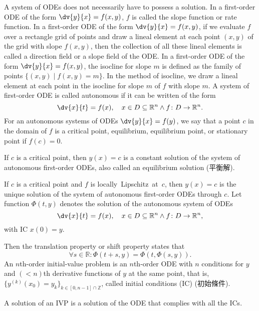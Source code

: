 \documentclass[a4paper,12pt]{report}
\begin{document}
\begin{itemize}
\begin{itemize}
A system of ODEs does not necessarily have to possess a solution.
In a first-order ODE of the form $\dv{y}{x}=f(x,y)$, $f$ is called the slope function or rate function.
In a first-order ODE of the form $\dv{y}{x}=f(x,y)$, if we evaluate $f$ over a rectangle grid of points and draw a lineal element at each point $(x,y)$ of the grid with slope $f(x,y)$, then the collection of all these lineal elements is called a direction field or a slope field of the ODE.
In a first-order ODE of the form $\dv{y}{x}=f(x,y)$, the isocline for slope $m$ is defined as the family of points $\{(x,y)\mid f(x,y)=m\}$. In the method of isocline, we draw a lineal element at each point in the isocline for slope $m$ of $f$ with slope $m$.
A system of first-order ODE is called autonomous if it can be written of the form
\[\dv{x}{t}=f(x),\quad x\in D\subseteq\mathbb{R}^n\land f\colon D\to\mathbb{R}^n.\]
For an autonomous systems of ODEs $\dv{y}{x}=f(y)$, we say that a point $c$ in the domain of $f$ is a critical point, equilibrium, equilibrium point, or stationary point if $f(c)=0$.

If $c$ is a critical point, then $y(x)=c$ is a constant solution of the system of autonomous first-order ODEs, also called an equilibrium solution (平衡解).

If $c$ is a critical point and $f$ is locally Lipschitz at $c$, then $y(x)=c$ is the unique solution of the system of autonomous first-order ODEs through $c$.
Let function $\Phi(t,y)$ denotes the solution of the autonomous system of ODEs
\[\dv{x}{t}=f(x),\quad x\in D\subseteq\mathbb{R}^n\land f\colon D\to\mathbb{R}^n,\]
with IC $x(0)=y$.

Then the translation property or shift property states that
\[\forall s\in\mathbb{R}\colon\Phi(t+s,y)=\Phi(t,\Phi(s,y)).\]
An $n$th-order initial-value problem is an $n$th-order ODE with $n$ conditions for $y$ and $(<n)$th derivative functions of $y$ at the same point, that is, $\{y^{(k)}(x_0)=y_k\}_{k\in[0,n-1]\cap\mathbb{Z}}$, called initial conditions (IC) (初始條件).

A solution of an IVP is a solution of the ODE that complies with all the ICs.


\end{itemize}
\end{itemize}
\end{document}
